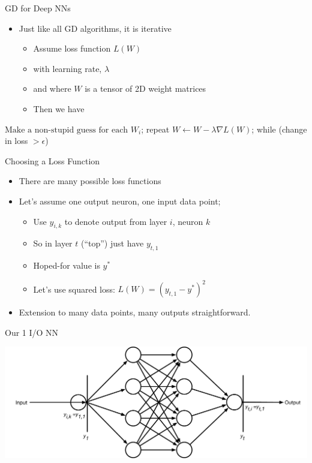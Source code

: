 \documentclass[aspectratio=169]{beamer}
\begin{document}
\begin{frame}[fragile]{GD for Deep NNs}

\begin{itemize}
	\item Just like all GD algorithms, it is iterative
	\begin{itemize}
	\item Assume loss function $L(W)$
	\item with learning rate, $\lambda$ 
	\item and where $W$ is a tensor of 2D weight matrices
	\item Then we have
	\end{itemize}
\end{itemize}

\begin{SQL}
$\textrm{Make a non-stupid guess for each } W_i$;
repeat {
  $W \leftarrow W - \lambda \nabla L (W)$;
} while (change in loss $> \epsilon$)
\end{SQL}
\end{frame}
\begin{frame}{Choosing a Loss Function}

\begin{itemize}
	\item There are many possible loss functions
	\item Let's assume one output neuron, one input data point; 
	\begin{itemize}
		\item Use $y_{i,k}$ to denote output from layer $i$, neuron $k$
		\item So in layer $t$ (``top'') just have $y_{t,1}$
		\item Hoped-for value is $y^{*}$
		\item Let's use squared loss: $L(W) = (y_{t,1} - y^{*})^2$
	\end{itemize}
	\item Extension to many data points, many outputs straightforward.                                                                          
\end{itemize}
\end{frame}
\begin{frame}{Our 1 I/O NN}

\includegraphics[width=1\textwidth]{lectBP/nnbp.pdf}
\end{frame}
\end{document}
